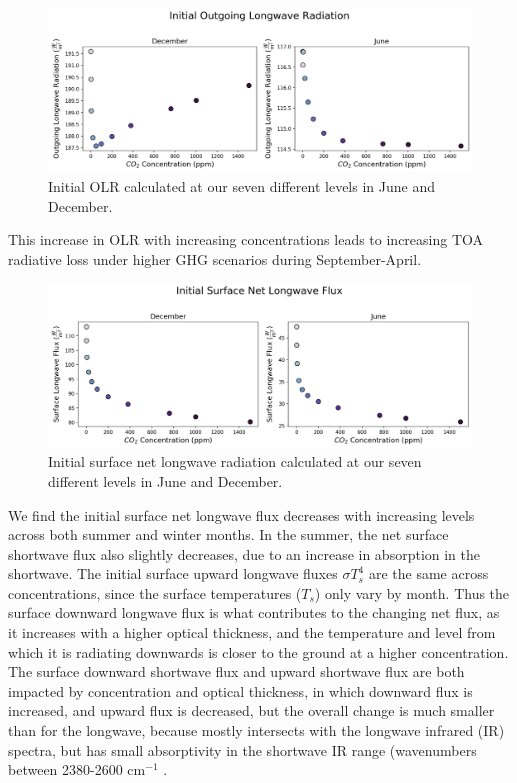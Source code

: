 \documentclass[12]{article}
\begin{document}
\begin{figure}[htb!]
\noindent\includegraphics[width=1\textwidth]{figures/OLR_init.png}
\centering
\caption{Initial OLR calculated at our seven different  levels in June and December.}
\label{fig:init_OLR}
\end{figure}

This increase in OLR with increasing  concentrations leads to increasing TOA radiative loss under higher GHG scenarios during September-April. 

\begin{figure}[htb!]
\noindent\includegraphics[width=1\textwidth]{figures/sfcLW_init.png}
\centering
\caption{Initial surface net longwave radiation calculated at our seven different  levels in June and December.}
\label{fig:init_sfc_LW}
\end{figure}

We find the initial surface net longwave flux decreases with increasing  levels across both summer and winter months. In the summer, the net surface shortwave flux also slightly decreases, due to an increase in  absorption in the shortwave.  The initial surface upward longwave fluxes $\sigma T_s^4$ are the same across  concentrations, since the surface temperatures ($T_s$) only vary by month. Thus the surface downward longwave flux is what contributes to the changing net flux, as it increases with a higher optical thickness, and the temperature and level from which it is radiating downwards is closer to the ground at a higher  concentration. The surface downward shortwave flux and upward shortwave flux are both impacted by  concentration and optical thickness, in which downward flux is increased, and upward flux is decreased, but the overall change is much smaller than for the longwave, because  mostly intersects with the longwave infrared (IR) spectra, but has small absorptivity in the shortwave IR range (wavenumbers between 2380-2600 cm$^{-1}$ \citep{mlawer_radiative_1997}. 
\end{document}
